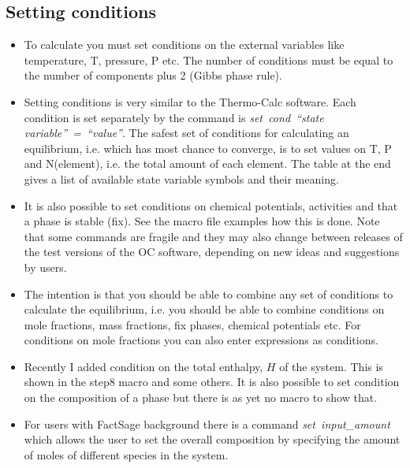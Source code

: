 \documentclass[12pt]{article}
\begin{document}
\subsection{Setting conditions}

\begin{itemize}
\item To calculate you must set conditions on the external variables
  like temperature, T, pressure, P etc.  The number of conditions must
  be equal to the number of components plus 2 (Gibbs phase rule).

\item Setting conditions is very similar to the Thermo-Calc software.
  Each condition is set separately by the command is {\em
    set~cond~``state variable''~=~``value''}.  The safest set of
  conditions for calculating an equilibrium, i.e. which has most
  chance to converge, is to set values on T, P and N(element),
  i.e. the total amount of each element.  The table at the end gives a
  list of available state variable symbols and their meaning.

\item It is also possible to set conditions on chemical potentials,
  activities and that a phase is stable (fix).  See the macro file
  examples how this is done.  Note that some commands are fragile and
  they may also change between releases of the test versions of the OC
  software, depending on new ideas and suggestions by users.

\item The intention is that you should be able to combine any set of
  conditions to calculate the equilibrium, i.e. you should be able to
  combine conditions on mole fractions, mass fractions, fix phases,
  chemical potentials etc.  For conditions on mole fractions
  you can also enter expressions as conditions.

\item Recently I added condition on the total enthalpy, $H$ of the
  system.  This is shown in the step8 macro and some others.  It is
  also possible to set condition on the composition of a phase but
  there is as yet no macro to show that.

\item For users with FactSage background there is a command {\em
  set~input\_amount} which allows the user to set the overall
  composition by specifying the amount of moles of different species
  in the system.

\end{itemize}
\end{document}

